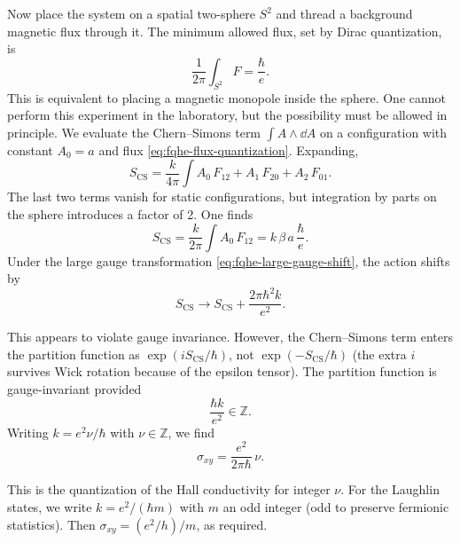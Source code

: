 Now place the system on a spatial two-sphere $S^2$ and thread a background magnetic flux through it. The minimum allowed flux, set by Dirac quantization, is
\begin{equation}
  \frac{1}{2\pi}\int_{S^2} F = \frac{\hbar}{e}.
  \label{eq:fqhe-flux-quantization}
\end{equation}
This is equivalent to placing a magnetic monopole inside the sphere. One cannot perform this experiment in the laboratory, but the possibility must be allowed in principle. We evaluate the Chern--Simons term $\int A\wedge\dd A$ on a configuration with constant $A_0=a$ and flux \eqref{eq:fqhe-flux-quantization}. Expanding,
\begin{equation}
  S_{\mathrm{CS}} = \frac{k}{4\pi}\int A_0\,F_{12} + A_1\,F_{20} + A_2\,F_{01}.
  \label{eq:fqhe-cs-expanded}
\end{equation}
The last two terms vanish for static configurations, but integration by parts on the sphere introduces a factor of 2. One finds
\begin{equation}
  S_{\mathrm{CS}} = \frac{k}{2\pi}\int A_0\,F_{12} = k\,\beta\,a\,\frac{\hbar}{e}.
  \label{eq:fqhe-cs-evaluated}
\end{equation}
Under the large gauge transformation \eqref{eq:fqhe-large-gauge-shift}, the action shifts by
\begin{equation}
  S_{\mathrm{CS}} \to S_{\mathrm{CS}} + \frac{2\pi\hbar^2 k}{e^2}.
  \label{eq:fqhe-cs-shift}
\end{equation}

This appears to violate gauge invariance. However, the Chern--Simons term enters the partition function as $\exp(iS_{\mathrm{CS}}/\hbar)$, not $\exp(-S_{\mathrm{CS}}/\hbar)$ (the extra $i$ survives Wick rotation because of the epsilon tensor). The partition function is gauge-invariant provided
\begin{equation}
  \frac{\hbar k}{e^2} \in \mathbb{Z}.
  \label{eq:fqhe-quantization-condition}
\end{equation}
Writing $k = e^2\nu/\hbar$ with $\nu\in\mathbb{Z}$, we find
\begin{equation}
  \sigma_{xy} = \frac{e^2}{2\pi\hbar}\,\nu.
  \label{eq:fqhe-quantized-conductivity}
\end{equation}

This is the quantization of the Hall conductivity for integer $\nu$. For the Laughlin states, we write $k=e^2/(\hbar m)$ with $m$ an odd integer (odd to preserve fermionic statistics). Then $\sigma_{xy}=(e^2/h)/m$, as required.

